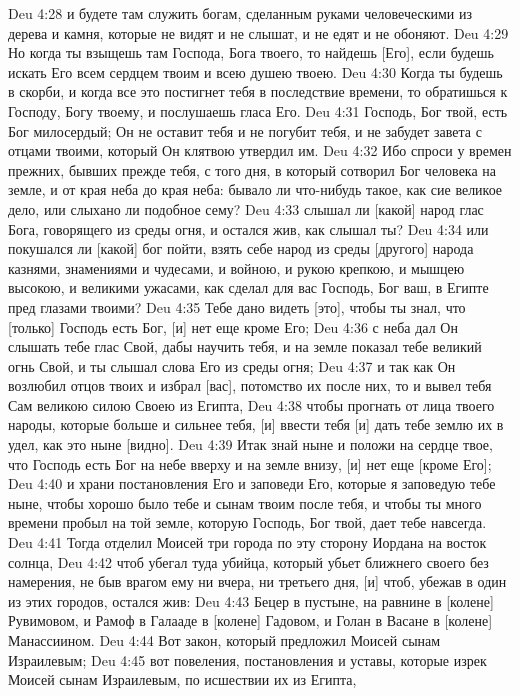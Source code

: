 Deu 4:28  и будете там служить богам, сделанным руками человеческими из дерева и камня, которые не видят и не слышат, и не едят и не обоняют.
Deu 4:29  Но когда ты взыщешь там Господа, Бога твоего, то найдешь [Его], если будешь искать Его всем сердцем твоим и всею душею твоею.
Deu 4:30  Когда ты будешь в скорби, и когда все это постигнет тебя в последствие времени, то обратишься к Господу, Богу твоему, и послушаешь гласа Его.
Deu 4:31  Господь, Бог твой, есть Бог милосердый; Он не оставит тебя и не погубит тебя, и не забудет завета с отцами твоими, который Он клятвою утвердил им.
Deu 4:32  Ибо спроси у времен прежних, бывших прежде тебя, с того дня, в который сотворил Бог человека на земле, и от края неба до края неба: бывало ли что-нибудь такое, как сие великое дело, или слыхано ли подобное сему?
Deu 4:33  слышал ли [какой] народ глас Бога, говорящего из среды огня, и остался жив, как слышал ты?
Deu 4:34  или покушался ли [какой] бог пойти, взять себе народ из среды [другого] народа казнями, знамениями и чудесами, и войною, и рукою крепкою, и мышцею высокою, и великими ужасами, как сделал для вас Господь, Бог ваш, в Египте пред глазами твоими?
Deu 4:35  Тебе дано видеть [это], чтобы ты знал, что [только] Господь есть Бог, [и] нет еще кроме Его;
Deu 4:36  с неба дал Он слышать тебе глас Свой, дабы научить тебя, и на земле показал тебе великий огнь Свой, и ты слышал слова Его из среды огня;
Deu 4:37  и так как Он возлюбил отцов твоих и избрал [вас], потомство их после них, то и вывел тебя Сам великою силою Своею из Египта,
Deu 4:38  чтобы прогнать от лица твоего народы, которые больше и сильнее тебя, [и] ввести тебя [и] дать тебе землю их в удел, как это ныне [видно].
Deu 4:39  Итак знай ныне и положи на сердце твое, что Господь есть Бог на небе вверху и на земле внизу, [и] нет еще [кроме Его];
Deu 4:40  и храни постановления Его и заповеди Его, которые я заповедую тебе ныне, чтобы хорошо было тебе и сынам твоим после тебя, и чтобы ты много времени пробыл на той земле, которую Господь, Бог твой, дает тебе навсегда.
Deu 4:41  Тогда отделил Моисей три города по эту сторону Иордана на восток солнца,
Deu 4:42  чтоб убегал туда убийца, который убьет ближнего своего без намерения, не быв врагом ему ни вчера, ни третьего дня, [и] чтоб, убежав в один из этих городов, остался жив:
Deu 4:43  Бецер в пустыне, на равнине в [колене] Рувимовом, и Рамоф в Галааде в [колене] Гадовом, и Голан в Васане в [колене] Манассиином.
Deu 4:44  Вот закон, который предложил Моисей сынам Израилевым;
Deu 4:45  вот повеления, постановления и уставы, которые изрек Моисей сынам Израилевым, по исшествии их из Египта,
